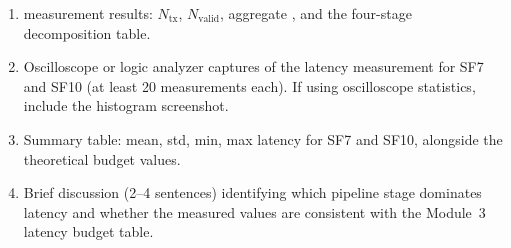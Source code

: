 \documentclass[11pt,letterpaper]{article}
\begin{document}
\begin{tcolorbox}[deliverable={Lab Handout 3-D Deliverable}]
	\begin{enumerate}[leftmargin=1.2em]
		\item \PER{} measurement results: $N_{\text{tx}}$, $N_{\text{valid}}$, aggregate \PER{}, and the four-stage decomposition table.
		\item Oscilloscope or logic analyzer captures of the \GPIO{} latency measurement for SF7 and SF10 (at least 20 measurements each). If using oscilloscope statistics, include the histogram screenshot.
		\item Summary table: mean, std, min, max latency for SF7 and SF10, alongside the theoretical budget values.
		\item Brief discussion (2--4 sentences) identifying which pipeline stage dominates latency and whether the measured values are consistent with the Module~3 latency budget table.
	\end{enumerate}
\end{tcolorbox}

\printhandoutglossary
\end{document}
